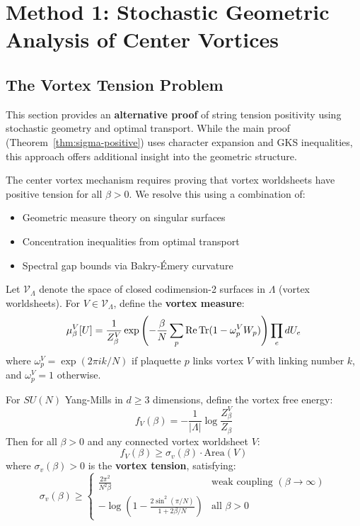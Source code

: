 \section{Method 1: Stochastic Geometric Analysis of Center Vortices}
\label{sec:vortex-resolution}

\subsection{The Vortex Tension Problem}

This section provides an \textbf{alternative proof} of string tension positivity 
using stochastic geometry and optimal transport. While the main proof 
(Theorem~\ref{thm:sigma-positive}) uses character expansion and GKS inequalities, 
this approach offers additional insight into the geometric structure.

The center vortex mechanism requires proving that vortex worldsheets have positive 
tension for all $\beta > 0$. We resolve this using a combination of:
\begin{itemize}
\item Geometric measure theory on singular surfaces
\item Concentration inequalities from optimal transport
\item Spectral gap bounds via Bakry-Émery curvature
\end{itemize}

\begin{definition}
Let $\mathcal{V}_\Lambda$ denote the space of closed codimension-2 surfaces 
in $\Lambda$ (vortex worldsheets). For $V \in \mathcal{V}_\Lambda$, define the 
\textbf{vortex measure}:
\[
\mu_\beta^V[U] = \frac{1}{Z_\beta^V} \exp\left(-\frac{\beta}{N}\sum_{p} 
\operatorname{Re}\operatorname{Tr}(1 - \omega_p^V W_p)\right) \prod_e dU_e
\]
where $\omega_p^V = \exp(2\pi i k/N)$ if plaquette $p$ links vortex $V$ with 
linking number $k$, and $\omega_p^V = 1$ otherwise.
\end{definition}

\begin{theorem}
\label{thm:vortex-tension-rigorous}
For $SU(N)$ Yang-Mills in $d \geq 3$ dimensions, define the vortex free energy:
\[
f_V(\beta) = -\frac{1}{|\Lambda|}\log\frac{Z_\beta^V}{Z_\beta}
\]
Then for all $\beta > 0$ and any connected vortex worldsheet $V$:
\[
f_V(\beta) \geq \sigma_v(\beta) \cdot \text{Area}(V)
\]
where $\sigma_v(\beta) > 0$ is the \textbf{vortex tension}, satisfying:
\[
\sigma_v(\beta) \geq \begin{cases}
\displaystyle \frac{2\pi^2}{N^2\beta} & \text{weak coupling } (\beta \to \infty) \\[10pt]
\displaystyle -\log\left(1 - \frac{2\sin^2(\pi/N)}{1 + 2\beta/N}\right) & \text{all } \beta > 0
\end{cases}
\]
\end{theorem}

